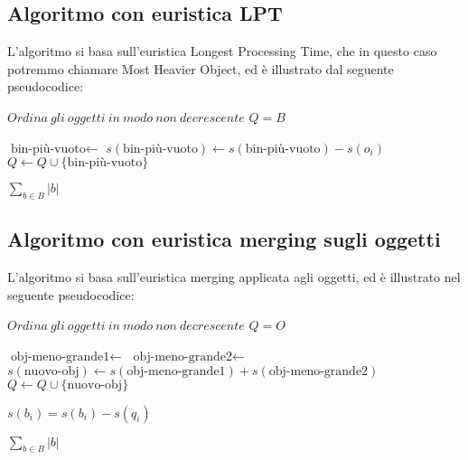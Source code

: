 \subsection{Algoritmo con euristica LPT}
L'algoritmo si basa sull'euristica Longest Processing Time, che in questo caso potremmo chiamare Most Heavier Object, ed è illustrato dal seguente pseudocodice:
\begin{algorithm}
\begin{algorithmic}[1]

       
    \State $ Ordina \: gli \: oggetti \: in \: modo \: non \: decrescente $
    \State $ Q = B $

        \State $ \text{bin-più-vuoto} \leftarrow $ 
        \State $ s(\text{bin-più-vuoto}) \leftarrow  s(\text{bin-più-vuoto}) - s(o_i) $
        \State $ Q \leftarrow Q \cup \{\text{bin-più-vuoto}\} $
    \EndFor
    
    \State \Return $ \displaystyle\sum\limits_{b \in B} |b| $
\EndFunction

\end{algorithmic}
\end{algorithm}

\subsection{Algoritmo con euristica merging sugli oggetti}
L'algoritmo si basa sull'euristica merging applicata agli oggetti, ed è illustrato nel seguente pseudocodice:
\begin{algorithm}
\begin{algorithmic}[1]

       
    \State $ Ordina \: gli \: oggetti \: in \: modo \: non \: decrescente $
    \State $ Q = O $

        \State $ \text{obj-meno-grande1} \leftarrow $ 
        \State $ \text{obj-meno-grande2} \leftarrow $ 
        \State $ s(\text{nuovo-obj}) \leftarrow s(\text{obj-meno-grande1}) + s(\text{obj-meno-grande2}) $
        \State $ Q \leftarrow Q \cup \{\text{nuovo-obj}\} $
    \EndWhile
    
    	\State $ s(b_i) = s(b_i) - s(q_i) $
    \EndFor
    
    \State \Return $ \displaystyle\sum\limits_{b \in B} |b| $
\EndFunction

\end{algorithmic}
\end{algorithm}